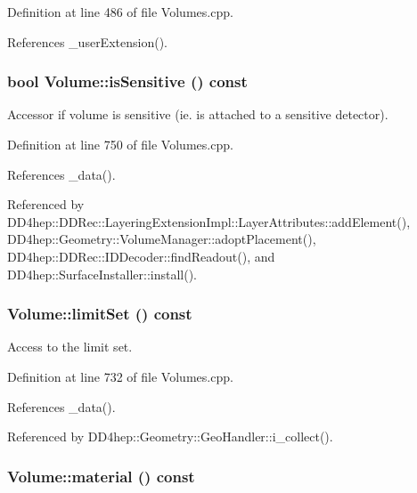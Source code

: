 Definition at line 486 of file Volumes.cpp.

References \_\-userExtension().\hypertarget{class_d_d4hep_1_1_geometry_1_1_volume_a7b4a6460ec44a12b59fc1a00556c21cf}{
\subsubsection[{isSensitive}]{\setlength{\rightskip}{0pt plus 5cm}bool Volume::isSensitive () const}}
\label{class_d_d4hep_1_1_geometry_1_1_volume_a7b4a6460ec44a12b59fc1a00556c21cf}


Accessor if volume is sensitive (ie. is attached to a sensitive detector). 

Definition at line 750 of file Volumes.cpp.

References \_\-data().

Referenced by DD4hep::DDRec::LayeringExtensionImpl::LayerAttributes::addElement(), DD4hep::Geometry::VolumeManager::adoptPlacement(), DD4hep::DDRec::IDDecoder::findReadout(), and DD4hep::SurfaceInstaller::install().\hypertarget{class_d_d4hep_1_1_geometry_1_1_volume_aeadd5c51ef8dc4c601e191beea40edbc}{
\subsubsection[{limitSet}]{ Volume::limitSet () const}}
\label{class_d_d4hep_1_1_geometry_1_1_volume_aeadd5c51ef8dc4c601e191beea40edbc}


Access to the limit set. 

Definition at line 732 of file Volumes.cpp.

References \_\-data().

Referenced by DD4hep::Geometry::GeoHandler::i\_\-collect().\hypertarget{class_d_d4hep_1_1_geometry_1_1_volume_ab27715df3e7b1b8f36ca802e6d894005}{
\subsubsection[{material}]{ Volume::material () const}}
\label{class_d_d4hep_1_1_geometry_1_1_volume_ab27715df3e7b1b8f36ca802e6d894005}


